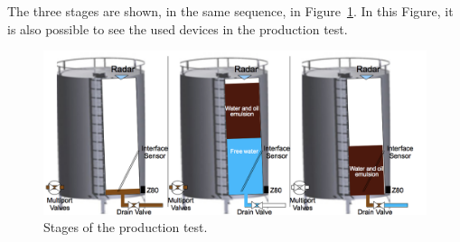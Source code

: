 \documentclass[11pt]{article} %
\begin{document}
The three stages are shown, in the same sequence, in Figure~\ref{fig:CaseStudy}.
In this Figure, it is also possible to see the used devices in the production
test.

\begin{figure}[h] \centering \includegraphics[width=1.\textwidth]{images/FasesEstudoDeCaso.png}
\caption{Stages of the production test.}
\label{fig:CaseStudy}
\end{figure}





\end{document}

